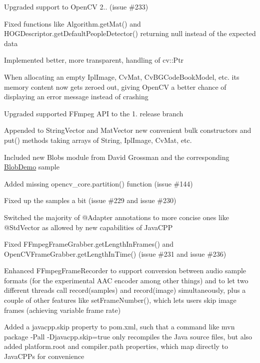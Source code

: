 \begin{DoxyItemize}
\item Upgraded support to Open\+C\+V 2.. (issue \#233)
\item Fixed functions like {\ttfamily Algorithm.\+get\+Mat()} and {\ttfamily H\+O\+G\+Descriptor.\+get\+Default\+People\+Detector()} returning {\ttfamily null} instead of the expected data
\item Implemented better, more transparent, handling of {\ttfamily cv\+::\+Ptr}
\item When allocating an empty {\ttfamily Ipl\+Image}, {\ttfamily Cv\+Mat}, {\ttfamily Cv\+B\+G\+Code\+Book\+Model}, etc. its memory content now gets zeroed out, giving Open\+C\+V a better chance of displaying an error message instead of crashing
\item Upgraded supported F\+Fmpeg A\+P\+I to the 1. release branch
\item Appended to {\ttfamily String\+Vector} and {\ttfamily Mat\+Vector} new convenient bulk constructors and {\ttfamily put()} methods taking arrays of {\ttfamily String}, {\ttfamily Ipl\+Image}, {\ttfamily Cv\+Mat}, etc.
\item Included new {\ttfamily Blobs} module from David Grossman and the corresponding {\ttfamily \hyperlink{class_blob_demo}{Blob\+Demo}} sample
\item Added missing {\ttfamily opencv\+\_\+core.\+partition()} function (issue \#144)
\item Fixed up the samples a bit (issue \#229 and issue \#230)
\item Switched the majority of {\ttfamily @Adapter} annotations to more concise ones like {\ttfamily @Std\+Vector} as allowed by new capabilities of Java\+C\+P\+P
\item Fixed {\ttfamily F\+Fmpeg\+Frame\+Grabber.\+get\+Length\+In\+Frames()} and {\ttfamily Open\+C\+V\+Frame\+Grabber.\+get\+Length\+In\+Time()} (issue \#231 and issue \#236)
\item Enhanced {\ttfamily F\+Fmpeg\+Frame\+Recorder} to support conversion between audio sample formats (for the experimental A\+A\+C encoder among other things) and to let two different threads call {\ttfamily record(samples)} and {\ttfamily record(image)} simultaneously, plus a couple of other features like {\ttfamily set\+Frame\+Number()}, which lets users skip image frames (achieving variable frame rate)
\item Added a {\ttfamily javacpp.\+skip} property to {\ttfamily pom.\+xml}, such that a command like {\ttfamily mvn package -\/\+Pall -\/\+Djavacpp.\+skip=true} only recompiles the Java source files, but also added {\ttfamily platform.\+root} and {\ttfamily compiler.\+path} properties, which map directly to Java\+C\+P\+P\textquotesingle{}s for convenience
\end{DoxyItemize}


